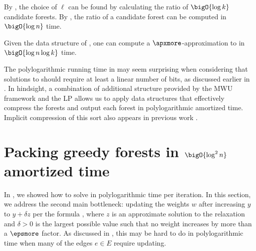 \documentclass{toc}
\begin{document}
By , the choice of $\ell$ can be found by
calculating the ratio of $\bigO{\log k}$ candidate forests. By
, the ratio of a candidate forest can be
computed in $\bigO{\log n}$ time.

\begin{lemma}
   Given the data structure of
  , one can compute a
$\apxmore$-approximation   %
to  in $\bigO{\log n \log k}$
 time.
\end{lemma}

The polylogarithmic running time in 
%
may seem %
surprising when considering that solutions to 
should require at least a linear number of bits, as discussed earlier
in . In hindsight, a combination of additional
structure provided by the MWU framework and the LP
 allows us to apply data structures that
effectively compress the forests and output each forest in
polylogarithmic amortized time. Implicit compression of this sort also
appears in previous work \cite{cq-17-soda,cq-17-focs,cq-19}.

\section{Packing greedy forests in $\bigO{\log^2 n}$ amortized time}


In , we showed how to solve
 in polylogarithmic time per iteration.  In
this section, we address the second main bottleneck: updating the
weights $w$ after increasing $y$ to $y + \delta z$ per the formula
, where $z$ is an approximate solution to the
relaxation  and $\delta > 0$ is the largest
possible value such that no weight increases by more than a
%
$\epsmore$ factor.   %
As discussed in
, this may be hard to do in polylogarithmic
time when many of the edges $e \in E$ require updating.
\end{document}
